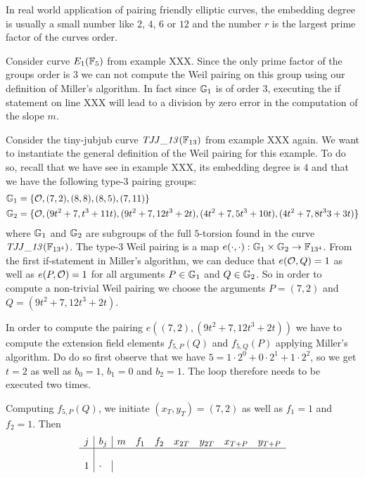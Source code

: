 In real world application of pairing friendly elliptic curves, the embedding degree is usually a small number like $2$, $4$, $6$ or $12$ and the number $r$ is the largest prime factor of the curves order.
\begin{example}Consider curve $E_1(\mathbb{F}_5)$ from example XXX. Since the only prime factor of the groups order is $3$ we can not compute the Weil pairing on this group using our definition of Miller's algorithm. In fact since $\mathbb{G}_1$ is of order $3$, executing the if statement on line XXX will lead to a division by zero error in the computation of the slope $m$.
\end{example}
\begin{example} Consider the tiny-jubjub curve $\mathit{TJJ\_13}(\mathbb{F}_{13})$ from example XXX again. We want to instantiate the general definition of the Weil pairing for this example. To do so, recall that we have see in example XXX, its embedding degree is $4$ and that we have the following type-3 pairing groups:
\begin{align*}
\mathbb{G}_1 & = \{\mathcal{O}, (7,2), (8,8), (8,5), (7,11)\}\\
\mathbb{G}_2 & = \{\mathcal{O}, (9t^2 + 7,t^3 + 11t), (9t^2 + 7, 12t^3 + 2t), 
(4t^2 + 7, 5t^3 + 10t), (4t^2 + 7, 8t^33 + 3t)\}
\end{align*}
where $\mathbb{G}_1$ and $\mathbb{G}_2$ are subgroups of the full $5$-torsion found in the curve $\mathit{TJJ\_13}(\mathbb{F}_{13^4})$. The type-3 Weil pairing is a map $e(\cdot,\cdot): \mathbb{G}_1 \times \mathbb{G}_2 \to \mathbb{F}_{13^4}$. From the first if-statement in Miller's algorithm, we can deduce that 
$e(\mathcal{O},Q)=1$ as well as $e(P,\mathcal{O})=1$ for all arguments $P\in\mathbb{G}_1$ and $Q\in \mathbb{G}_2$. So in order to compute a non-trivial Weil pairing we choose the arguments 
$P=(7,2)$ and $Q=(9t^2 + 7, 12t^3 + 2t)$. 

In order to compute the pairing $e((7,2),(9t^2 + 7, 12t^3 + 2t))$ we have to compute the extension field elements $f_{5,P}(Q)$ and $f_{5,Q}(P)$ applying Miller's algorithm. Do do so first observe that we have $5 = 1\cdot 2^0 + 0 \cdot 2^1 + 1\cdot 2^2$, so we get $t=2$ as well as $b_0=1$, $b_1=0$ and $b_2=1$. The loop therefore needs to be executed two times. 

Computing $f_{5,P}(Q)$, we initiate $(x_T,y_T) = (7,2)$ as well as $f_1=1$ and $f_2=1$. Then 
$$
\begin{array}{l|l|lllllll}
j & b_j & m & f_1 & f_2 & x_{2T} & y_{2T} & x_{T+P} & y_{T+P}\\
\hline\\
1 & \cdot & 
\end{array}
$$


\end{example}
